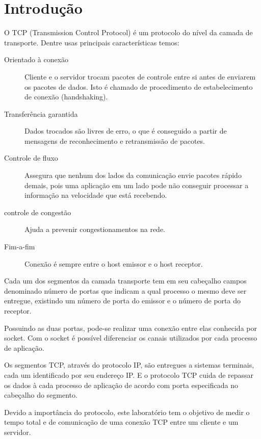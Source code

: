\documentclass[10pt,a4paper]{article}
\begin{document}
\section{Introdução}
O TCP (Transmission Control Protocol) é um protocolo do nível da
camada de transporte. Dentre usas principais características temos:
\begin{description}
\item[Orientado à conexão]  Cliente e o servidor trocam pacotes de
controle entre si antes de enviarem os pacotes de dados. Isto é chamado de procedimento de
estabelecimento de conexão (handshaking). 
\item[Transferência garantida] Dados trocados são livres de erro, o que é conseguido a partir de
mensagens de reconhecimento e retransmissão de pacotes. 
\item[Controle de fluxo] Assegura que nenhum dos lados da comunicação envie pacotes rápido demais, pois uma aplicação em um
lado pode não conseguir processar a informação na velocidade que está
recebendo.
\item[controle de congestão] Ajuda a prevenir congestionamentos na
  rede.
\item[Fim-a-fim ] Conexão é sempre entre o host emissor e o host receptor.

\end{description}

Cada um dos segmentos da camada transporte tem em seu cabeçalho campos
denominado número de portas que indicam a qual processo o mesmo deve
ser entregue, existindo um número de porta do emissor e o número de porta do
receptor. 

Possuindo as duas portas, pode-se realizar uma conexão entre elas
conhecida por socket. Com o socket é possível diferenciar os canais
utilizados por cada processo de aplicação.

Os segmentos TCP, através do protocolo IP, são entregues a sistemas terminais, cada um
identificado por seu endereço IP. E o protocolo TCP cuida de repassar
os dados à cada processo de aplicação de acordo com porta especificada no
cabeçalho do segmento.

Devido a importância do protocolo, este laboratório tem o objetivo de
medir o tempo total e de comunicação de uma conexão TCP entre um
cliente e um servidor.

\end{document}
